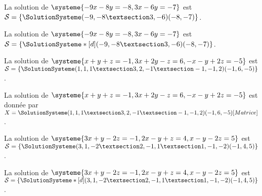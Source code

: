 \documentclass[french,a4paper,10pt]{article}
\begin{document}
\begin{ShowCodeTeX}
La solution de $\systeme{-9x-8y=-8,3x-6y=-7}$ est $\mathcal{S}=%
\left\lbrace \SolutionSysteme(-9,-8 § 3,-6)(-8,-7) \right\rbrace$.
\end{ShowCodeTeX}

\begin{ShowCodeTeX}
La solution de $\systeme{-9x-8y=-8,3x-6y=-7}$ est $\mathcal{S}=%
\left\lbrace \SolutionSysteme*[d](-9,-8 § 3,-6)(-8,-7) \right\rbrace$.
\end{ShowCodeTeX}

\begin{ShowCodeTeX}
La solution de $\systeme{x+y+z=-1,3x+2y-z=6,-x-y+2z=-5}$ est $\mathcal{S}=%
\left\lbrace \SolutionSysteme(1,1,1 § 3,2,-1 § -1,-1,2)(-1,6,-5) \right\rbrace$.
\end{ShowCodeTeX}

\begin{ShowCodeTeX}
La solution de $\systeme{x+y+z=-1,3x+2y-z=6,-x-y+2z=-5}$ est donnée par $X=%
\SolutionSysteme(1,1,1 § 3,2,-1 § -1,-1,2)(-1,6,-5)[Matrice]$.
\end{ShowCodeTeX}

\begin{ShowCodeTeX}
La solution de $\systeme{3x+y-2z=-1,2x-y+z=4,x-y-2z=5}$ est $\mathcal{S}=%
\left\lbrace \SolutionSysteme(3,1,-2 § 2,-1,1 § 1,-1,-2)(-1,4,5) \right\rbrace$.
\end{ShowCodeTeX}

\begin{ShowCodeTeX}
La solution de $\systeme{3x+y-2z=-1,2x-y+z=4,x-y-2z=5}$ est $\mathcal{S}=%
\left\lbrace \SolutionSysteme*[d](3,1,-2 § 2,-1,1 § 1,-1,-2)(-1,4,5) \right\rbrace$.
\end{ShowCodeTeX}
\end{document}
